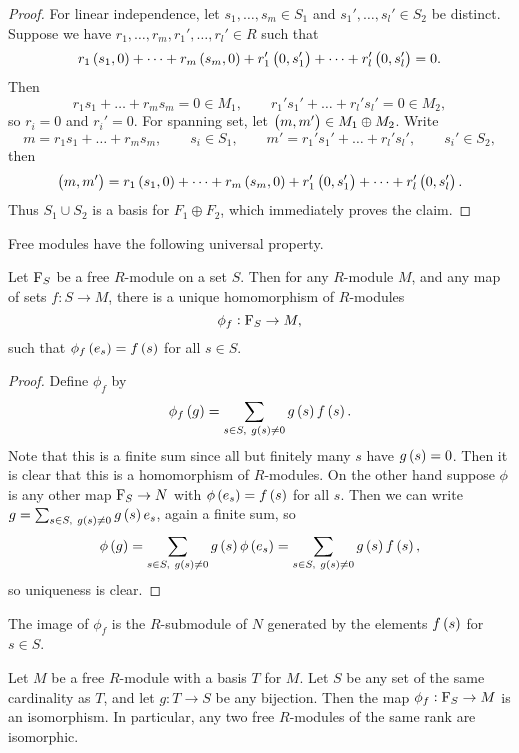\begin{proof}
For linear independence, let $ s_1, \dots, s_m \in S_1 $ and $ s_1', \dots, s_l' \in S_2 $ be distinct. Suppose we have $ r_1, \dots, r_m, r_1', \dots, r_l' \in R $ such that
$$ r_1\br{s_1, 0} + \dots + r_m\br{s_m, 0} + r_1'\br{0, s_1'} + \dots + r_l'\br{0, s_l'} = 0. $$
Then
$$ r_1s_1 + \dots + r_ms_m = 0 \in M_1, \qquad r_1's_1' + \dots + r_l's_l' = 0 \in M_2, $$
so $ r_i = 0 $ and $ r_i' = 0 $. For spanning set, let $ \br{m, m'} \in M_1 \oplus M_2 $. Write
$$ m = r_1s_1 + \dots + r_ms_m, \qquad s_i \in S_1, \qquad m' = r_1's_1' + \dots + r_l's_l', \qquad s_i' \in S_2, $$
then
$$ \br{m, m'} = r_1\br{s_1, 0} + \dots + r_m\br{s_m, 0} + r_1'\br{0, s_1'} + \dots + r_l'\br{0, s_l'}. $$
Thus $ S_1 \cup S_2 $ is a basis for $ F_1 \oplus F_2 $, which immediately proves the claim.
\end{proof}

Free modules have the following universal property.

\begin{proposition}
Let $ \mathrm{F}_S $ be a free $ R $-module on a set $ S $. Then for any $ R $-module $ M $, and any map of sets $ f : S \to M $, there is a unique homomorphism of $ R $-modules
$$ \phi_f : \mathrm{F}_S \to M, $$
such that $ \phi_f\br{e_s} = f\br{s} $ for all $ s \in S $.
\end{proposition}

\begin{proof}
Define $ \phi_f $ by
$$ \phi_f\br{g} = \sum_{s \in S, \ g\br{s} \ne 0} g\br{s}f\br{s}. $$
Note that this is a finite sum since all but finitely many $ s $ have $ g\br{s} = 0 $. Then it is clear that this is a homomorphism of $ R $-modules. On the other hand suppose $ \phi $ is any other map $ \mathrm{F}_S \to N $ with $ \phi\br{e_s} = f\br{s} $ for all $ s $. Then we can write $ g = \sum_{s \in S, \ g\br{s} \ne 0} g\br{s}e_s $, again a finite sum, so
$$ \phi\br{g} = \sum_{s \in S, \ g\br{s} \ne 0} g\br{s}\phi\br{e_s} = \sum_{s \in S, \ g\br{s} \ne 0} g\br{s}f\br{s}, $$
so uniqueness is clear.
\end{proof}

The image of $ \phi_f $ is the $ R $-submodule of $ N $ generated by the elements $ f\br{s} $ for $ s \in S $.

\begin{corollary}
Let $ M $ be a free $ R $-module with a basis $ T $ for $ M $. Let $ S $ be any set of the same cardinality as $ T $, and let $ g : T \to S $ be any bijection. Then the map $ \phi_f : \mathrm{F}_S \to M $ is an isomorphism. In particular, any two free $ R $-modules of the same rank are isomorphic.
\end{corollary}


